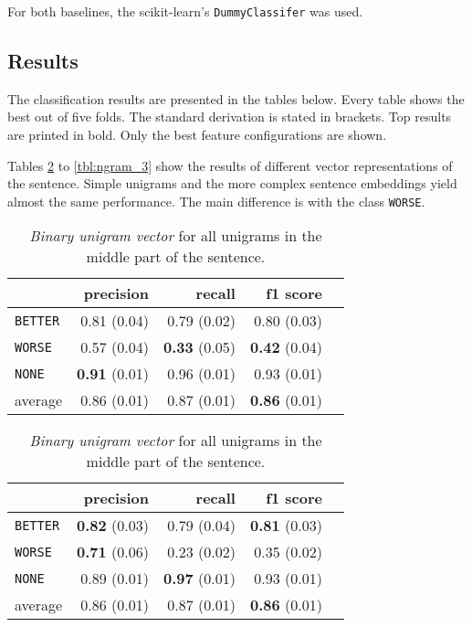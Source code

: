 For both baselines, the scikit-learn's \texttt{DummyClassifer} was used.



\subsection{Results}
The classification results are presented in the tables below. Every table shows the best out of five folds. The standard derivation is stated in brackets. Top results are printed in bold. Only the best feature configurations are shown.

Tables \ref{tbl:se3} to \ref{tbl:ngram_3} show the results of different vector representations of the sentence. Simple unigrams and the more complex sentence embeddings yield almost the same performance. The main difference is with the class \texttt{WORSE}.


\begin{table}[h]
    \begin{minipage}{.5\linewidth}
    
        \caption{\emph{Sentence embeddings on the middle part of the sentence}. (Standard derivation)} 
        \label{tbl:se3}
        \begin{tabular}{@{}lrrrr@{}}
\toprule
 	&	 precision &	 recall &	 f1 score  \\ \midrule 
\texttt{BETTER}	&	 0.81 \scriptsize{(0.04)} &	 0.79 \scriptsize{(0.02)} &	 0.80 \scriptsize{(0.03)}  \\ 
\texttt{WORSE}	&	 0.57 \scriptsize{(0.04)} &	 \textbf{0.33} \scriptsize{(0.05)} &	 \textbf{0.42} \scriptsize{(0.04)}  \\ 
\texttt{NONE}	&	 \textbf{0.91} \scriptsize{(0.01)} &	 0.96 \scriptsize{(0.01)} &	 0.93 \scriptsize{(0.01)}  \\ 
average	&	 0.86 \scriptsize{(0.01)} &	 0.87 \scriptsize{(0.01)} &	 \textbf{0.86} \scriptsize{(0.01)}  \\ 
\bottomrule
        \end{tabular} 
  \end{minipage} \hfill
    \begin{minipage}{.5\linewidth}
    \caption{ \emph{Binary unigram vector} for all unigrams in the middle part of the sentence. } 
          \begin{tabular}{@{}lrrrr@{}}
\toprule
 	&	 precision &	 recall &	 f1 score  \\ \midrule 
\texttt{BETTER}	&	 \textbf{0.82} \scriptsize{(0.03)} &	 0.79 \scriptsize{(0.04)} &	 \textbf{0.81} \scriptsize{(0.03)}  \\ 
\texttt{WORSE}	&	 \textbf{0.71} \scriptsize{(0.06)} &	 0.23 \scriptsize{(0.02)} &	 0.35 \scriptsize{(0.02)}  \\ 
\texttt{NONE}	&	 0.89 \scriptsize{(0.01)} &	 \textbf{0.97} \scriptsize{(0.01)} &	 0.93 \scriptsize{(0.01)}  \\ 
average	&	 0.86 \scriptsize{(0.01)} &	 0.87 \scriptsize{(0.01)} &	 \textbf{0.86} \scriptsize{(0.01)}  \\ 
\bottomrule
            \end{tabular}
    \end{minipage} 
\end{table}

